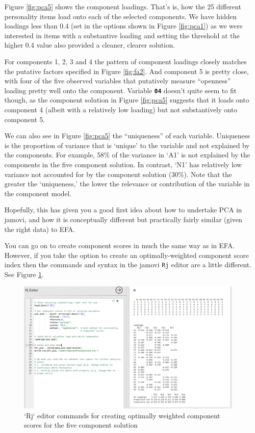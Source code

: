 \documentclass[
]{book}
\begin{document}
Figure \ref{fig:pca5} shows the component loadings. That's is, how the 25 different personality items load onto each of the selected components. We have hidden loadings less than 0.4 (set in the options shown in Figure \ref{fig:pca1}) as we were interested in items with a substantive loading and setting the threshold at the higher 0.4 value also provided a cleaner, clearer solution.

For components 1, 2, 3 and 4 the pattern of component loadings closely matches the putative factors specified in Figure \ref{fig:fa2}. And component 5 is pretty close, with four of the five observed variables that putatively measure ``openness'' loading pretty well onto the component. Variable \textbf{\texttt{04}} doesn't quite seem to fit though, as the component solution in Figure \ref{fig:pca5} suggests that it loads onto component 4 (albeit with a relatively low loading) but not substantively onto component 5.

We can also see in Figure \ref{fig:pca5} the ``uniqueness'' of each variable. Uniqueness is the proportion of variance that is `unique' to the variable and not explained by the components. For example, 58\% of the variance in `A1' is not explained by the components in the five component solution. In contrast, `N1' has relatively low variance not accounted for by the component solution (30\%). Note that the greater the `uniqueness,' the lower the relevance or contribution of the variable in the component model.

Hopefully, this has given you a good first idea about how to undertake PCA in jamovi, and how it is conceptually different but practically fairly similar (given the right data) to EFA.

You can go on to create component scores in much the same way as in EFA. However, if you take the option to create an optimally-weighted component score index then the commands and syntax in the jamovi \texttt{Rj} editor are a little different. See Figure \ref{fig:pca6}.

\begin{figure}

{\centering \includegraphics[width=1\linewidth]{img/factoranalysis/pca6} 

}

\caption{`Rj` editor commands for creating optimally weighted component scores for the five component solution}\label{fig:pca6}
\end{figure}
\end{document}
